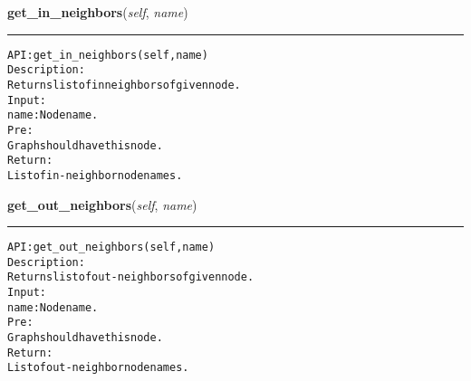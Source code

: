     \label{coinor:gimpy:graph:Graph:get_in_neighbors}

    \vspace{0.5ex}

\hspace{.8\funcindent}\begin{boxedminipage}{\funcwidth}

    \raggedright \textbf{get\_in\_neighbors}(\textit{self}, \textit{name})

    \vspace{-1.5ex}

    \rule{\textwidth}{0.5\fboxrule}
\setlength{\parskip}{2ex}
\begin{alltt}

API: get\_in\_neighbors(self, name)
Description:
Returns list of in neighbors of given node.
Input:
    name: Node name.
Pre:
    Graph should have this node.
Return:
    List of in-neighbor node names.
\end{alltt}

\setlength{\parskip}{1ex}
    \end{boxedminipage}

    \label{coinor:gimpy:graph:Graph:get_out_neighbors}

    \vspace{0.5ex}

\hspace{.8\funcindent}\begin{boxedminipage}{\funcwidth}

    \raggedright \textbf{get\_out\_neighbors}(\textit{self}, \textit{name})

    \vspace{-1.5ex}

    \rule{\textwidth}{0.5\fboxrule}
\setlength{\parskip}{2ex}
\begin{alltt}

API: get\_out\_neighbors(self, name)
Description:
Returns list of out-neighbors of given node.
Input:
    name: Node name.
Pre:
    Graph should have this node.
Return:
    List of out-neighbor node names.
\end{alltt}

\setlength{\parskip}{1ex}
    \end{boxedminipage}

